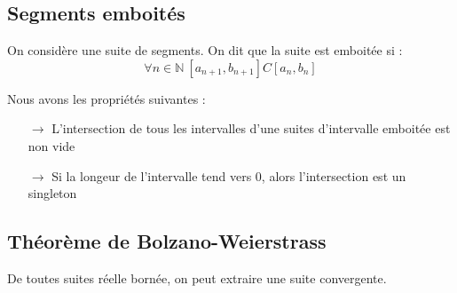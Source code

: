 \subsection{Segments emboités}
\begin{de}
On considère une suite de segments. On dit que la suite est emboitée si :
$$\forall n \in \mathbb{N}~ \left[a_{n+1},b_{n+1}\right] C \left[a_n,b_n\right]  $$
\end{de}
\begin{prop}
Nous avons les propriétés suivantes : 
\begin{itemize}
 \item[$\rightarrow$] L'intersection de tous les intervalles d'une suites d'intervalle emboitée est non vide
 \item[$\rightarrow$] Si la longeur de l'intervalle tend vers 0, alors l'intersection est un singleton
\end{itemize}
\end{prop}
\subsection{Théorème de Bolzano-Weierstrass}
\begin{theo}
De toutes suites réelle bornée, on peut extraire une suite convergente.
\end{theo}


